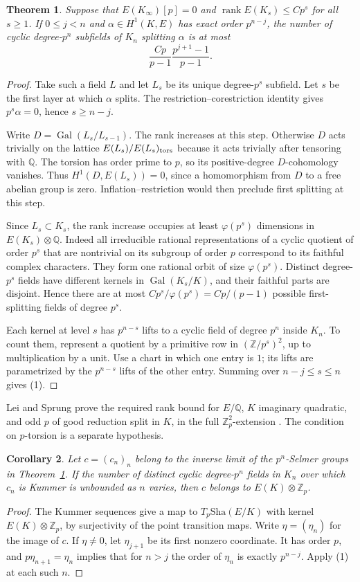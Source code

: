 \documentclass[11pt]{article}
\newtheorem{theorem}{Theorem}
\newtheorem{corollary}[theorem]{Corollary}
\newcommand{\Z}{\mathbb Z}
\newcommand{\Q}{\mathbb Q}
\newcommand{\Gal}{\operatorname{Gal}}
\newcommand{\rank}{\operatorname{rank}}
\newcommand{\Sha}{\mathrm{Sha}}
\begin{document}
\begin{theorem}\label{thm:count}
Suppose that $E(K_\infty)[p]=0$ and
$\rank E(K_s)\le Cp^s$ for all $s\ge1$. If $0\le j<n$ and
$\alpha\in H^1(K,E)$ has exact order $p^{n-j}$, the number of cyclic
degree-$p^n$ subfields of $K_n$ splitting $\alpha$ is at most
\[
 \frac{Cp}{p-1}\frac{p^{j+1}-1}{p-1}.
 \tag{1}
\]
\end{theorem}
\begin{proof}
Take such a field $L$ and let $L_s$ be its unique degree-$p^s$
subfield. Let $s$ be the first layer at which $\alpha$ splits.
The restriction--corestriction identity gives
$p^s\alpha=0$, hence $s\ge n-j$.

Write $D=\Gal(L_s/L_{s-1})$. The rank increases at this step.
Otherwise $D$ acts trivially on the lattice $E(L_s)/E(L_s)_{\rm tors}$
because it acts trivially after tensoring with $\Q$. The torsion has
order prime to $p$, so its positive-degree $D$-cohomology vanishes.
Thus $H^1(D,E(L_s))=0$, since a homomorphism from $D$ to a free
abelian group is zero. Inflation--restriction would then preclude
first splitting at this step.

Since $L_s\subset K_s$, the rank increase occupies at least
$\varphi(p^s)$ dimensions in $E(K_s)\otimes\Q$.
Indeed all irreducible rational representations of a cyclic quotient
of order $p^s$ that are nontrivial on its subgroup of order $p$
correspond to its faithful complex characters. They form one rational
orbit of size $\varphi(p^s)$. Distinct degree-$p^s$ fields have
different kernels in $\Gal(K_s/K)$, and their faithful parts are
disjoint. Hence there are at most $Cp^s/\varphi(p^s)=Cp/(p-1)$
possible first-splitting fields of degree $p^s$.

Each kernel at level $s$ has $p^{n-s}$ lifts to a cyclic field
of degree $p^n$ inside $K_n$. To count them, represent a quotient by
a primitive row in $(\Z/p^s)^2$, up to multiplication by a unit.
Use a chart in which one entry is $1$; its lifts are parametrized by
the $p^{n-s}$ lifts of the other entry. Summing over
$n-j\le s\le n$ gives (1).
\end{proof}

Lei and Sprung prove the required rank bound for $E/\Q$,
$K$ imaginary quadratic, and odd $p$ of good reduction split in $K$,
in the full $\Z_p^2$-extension \cite[Thm.~1.1]{LS}. The condition on
$p$-torsion is a separate hypothesis.

\begin{corollary}\label{cor:compatible}
Let $c=(c_n)_n$ belong to the inverse limit of the $p^n$-Selmer
groups in Theorem~\ref{thm:count}. If the number of distinct cyclic
degree-$p^n$ fields in $K_n$ over which $c_n$ is Kummer is unbounded
as $n$ varies, then $c$ belongs to $E(K)\otimes\Z_p$.
\end{corollary}
\begin{proof}
The Kummer sequences give a map to $T_p\Sha(E/K)$ with kernel
$E(K)\otimes\Z_p$, by surjectivity of the point transition maps.
Write $\eta=(\eta_n)$ for the image of $c$. If
$\eta\ne0$, let $\eta_{j+1}$ be its first nonzero coordinate.
It has order $p$, and $p\eta_{n+1}=\eta_n$ implies that for
$n>j$ the order of $\eta_n$ is exactly $p^{n-j}$.
Apply (1) at each such $n$.
\end{proof}
\end{document}
